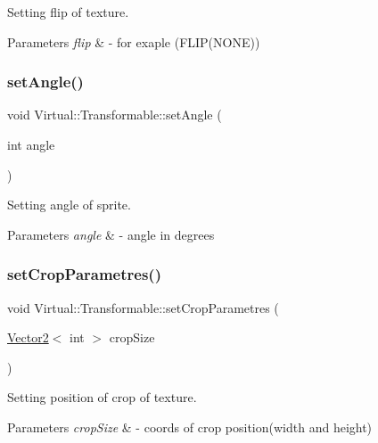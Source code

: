 Setting flip of texture. 


\begin{DoxyParams}{Parameters}
{\em flip} & -\/ for exaple (F\+L\+I\+P(\+N\+O\+N\+E)) \\
\hline
\end{DoxyParams}
\hypertarget{class_virtual_1_1_transformable_ae7305c3fe8a7bd9f4a1138a9d097bfab}{}\label{class_virtual_1_1_transformable_ae7305c3fe8a7bd9f4a1138a9d097bfab} 
\subsubsection{\texorpdfstring{set\+Angle()}{setAngle()}}
{\footnotesize\ttfamily void Virtual\+::\+Transformable\+::set\+Angle (\begin{DoxyParamCaption}\item[{int}]{angle }\end{DoxyParamCaption})}



Setting angle of sprite. 


\begin{DoxyParams}{Parameters}
{\em angle} & -\/ angle in degrees \\
\hline
\end{DoxyParams}
\hypertarget{class_virtual_1_1_transformable_a558026b1336c4f24c2bc70debc01800c}{}\label{class_virtual_1_1_transformable_a558026b1336c4f24c2bc70debc01800c} 
\subsubsection{\texorpdfstring{set\+Crop\+Parametres()}{setCropParametres()}}
{\footnotesize\ttfamily void Virtual\+::\+Transformable\+::set\+Crop\+Parametres (\begin{DoxyParamCaption}\item[{\hyperlink{struct_virtual_1_1_vector2}{Vector2}$<$ int $>$}]{crop\+Size }\end{DoxyParamCaption})}



Setting position of crop of texture. 


\begin{DoxyParams}{Parameters}
{\em crop\+Size} & -\/ coords of crop position(width and height) \\
\hline
\end{DoxyParams}
\hypertarget{class_virtual_1_1_transformable_afa2e1b7971db9c916a38f7dfa06a0b26}{}\label{class_virtual_1_1_transformable_afa2e1b7971db9c916a38f7dfa06a0b26} 
